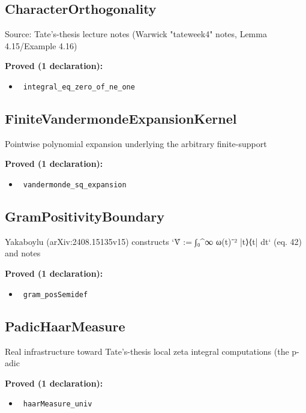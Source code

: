 \documentclass{report}
\theoremstyle{definition}
\begin{document}
\subsection{CharacterOrthogonality}
Source: Tate's-thesis lecture notes (Warwick "tateweek4" notes, Lemma 4.15/Example 4.16)

\noindent\textbf{Proved (1 declaration):}
\begin{itemize}
  \item {}\leanok\ \texttt{integral\_eq\_zero\_of\_ne\_one}
\end{itemize}

\subsection{FiniteVandermondeExpansionKernel}
Pointwise polynomial expansion underlying the arbitrary finite-support

\noindent\textbf{Proved (1 declaration):}
\begin{itemize}
  \item {}\leanok\ \texttt{vandermonde\_sq\_expansion}
\end{itemize}

\subsection{GramPositivityBoundary}
Yakaboylu (arXiv:2408.15135v15) constructs `V̂ := ∫₀^∞ ω(t)⁻² |t⟩⟨t| dt` (eq. 42) and notes

\noindent\textbf{Proved (1 declaration):}
\begin{itemize}
  \item {}\leanok\ \texttt{gram\_posSemidef}
\end{itemize}

\subsection{PadicHaarMeasure}
Real infrastructure toward Tate's-thesis local zeta integral computations (the p-adic

\noindent\textbf{Proved (1 declaration):}
\begin{itemize}
  \item {}\leanok\ \texttt{haarMeasure\_univ}
\end{itemize}
\end{document}
